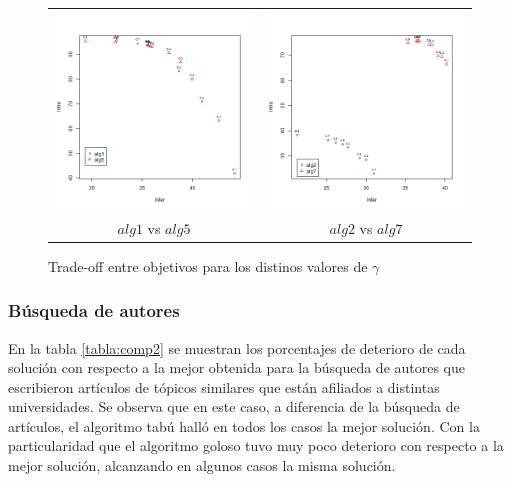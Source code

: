\begin{figure}[H]
	\centering
	\begin{tabular}{cc}
			\includegraphics[width=0.5\linewidth]{img/alg1_vs_alg5.png}&
			\includegraphics[width=0.5\linewidth]{img/alg2_vs_alg7.png}\\
			$alg1$ vs $alg5$ & $alg2$ vs $alg7$\\
	\end{tabular}
	\caption{Trade-off entre objetivos para los distinos valores de $\gamma$}
	\label{res:inter_intra}
\end{figure}

\subsubsection{Búsqueda de autores}
En la tabla \ref{tabla:comp2} se muestran los porcentajes de deterioro de cada solución con respecto a la mejor obtenida para la búsqueda de autores que escribieron artículos de tópicos similares que están afiliados a distintas universidades. Se observa que en este caso, a diferencia de la búsqueda de artículos, el algoritmo tabú halló en todos los casos la mejor solución. Con la particularidad que el algoritmo goloso tuvo muy poco deterioro con respecto a la mejor solución, alcanzando en algunos casos la misma solución.


